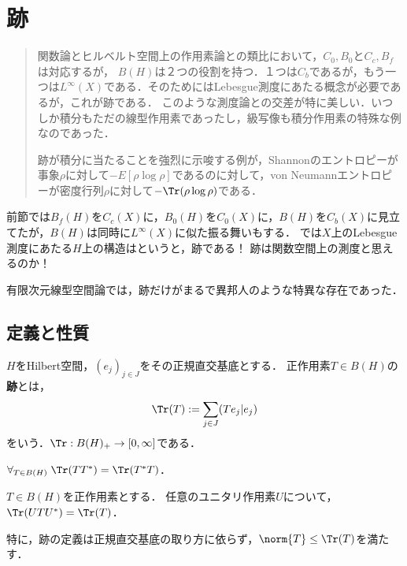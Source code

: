 \documentclass[uplatex,dvipdfmx]{jsreport}
\begin{document}
\section{跡}

\begin{quotation}
    関数論とヒルベルト空間上の作用素論との類比において，$C_0,B_0$と$C_c,B_f$は対応するが，
    $B(H)$は２つの役割を持つ．１つは$C_b$であるが，もう一つは$L^\infty(X)$である．そのためにはLebesgue測度にあたる概念が必要であるが，これが跡である．
    このような測度論との交差が特に美しい．いつしか積分もただの線型作用素であったし，級写像も積分作用素の特殊な例なのであった．

    跡が積分に当たることを強烈に示唆する例が，Shannonのエントロピーが事象$\rho$に対して$-E[\rho\log\rho]$であるのに対して，von Neumannエントロピーが密度行列$\rho$に対して$-\Tr(\rho\log\rho)$である．
\end{quotation}

\begin{tcolorbox}[colframe=ForestGreen, colback=ForestGreen!10!white,breakable,colbacktitle=ForestGreen!40!white,coltitle=black,fonttitle=\bfseries\sffamily,
title=跡は関数空間上の測度とみなせる]
    前節では$B_f(H)$を$C_c(X)$に，$B_0(H)$を$C_0(X)$に，$B(H)$を$C_b(X)$に見立てたが，$B(H)$は同時に$L^\infty(X)$に似た振る舞いもする．
    では$X$上のLebesgue測度にあたる$H$上の構造はというと，跡である！
    跡は関数空間上の測度と思えるのか！

    有限次元線型空間論では，跡だけがまるで異邦人のような特異な存在であった．
\end{tcolorbox}

\subsection{定義と性質}

\begin{definition}[trace]
    $H$をHilbert空間，$(e_j)_{j\in J}$をその正規直交基底とする．
    正作用素$T\in B(H)$の\textbf{跡}とは，
    \[\Tr(T):=\sum_{j\in J}(Te_j|e_j)\]
    をいう．$\Tr:B(H)_+\to[0,\infty]$である．
\end{definition}

\begin{proposition}
    $\forall_{T\in B(H)}\;\Tr(TT^*)=\Tr(T^*T)$．
\end{proposition}

\begin{corollary}
    $T\in B(H)$を正作用素とする．
    任意のユニタリ作用素$U$について，$\Tr(UTU^*)=\Tr(T)$．
    
    特に，跡の定義は正規直交基底の取り方に依らず，$\norm{T}\le\Tr(T)$を満たす．
\end{corollary}
\end{document}
